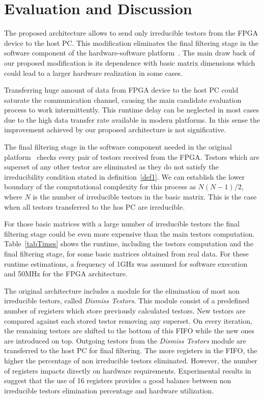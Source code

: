 \documentclass[conference]{IEEEtran}
\begin{document}
\section{Evaluation and Discussion}
\label{sect:6}

The proposed architecture allows to send only irreducible testors from the FPGA device to the 
host PC. This modification eliminates the final filtering stage in the software component of the 
hardware-software platform~\cite{Rojas12}. The main draw back of our proposed modification is its 
dependence with basic matrix dimensions which could lead to a larger hardware realization in some 
cases.  

Transferring huge amount of data from FPGA device to the host PC could saturate the communication 
channel, causing the main candidate evaluation process to work intermittently. This runtime delay 
can be neglected in most cases due to the high data transfer rate available in modern platforms. 
In this sense the improvement achieved by our proposed architecture is not significative.

The final filtering stage in the software component needed in the original platform~\cite{Rojas12} checks 
every pair of testors received from the FPGA. Testors which are superset of any other testor are 
eliminated as they do not satisfy the irreducibility condition stated in definition~\ref{def1}. We 
can establish the lower boundary of the computational complexity for this process as $N(N-1)/2$, 
where $N$ is the number of irreducible testors in the basic matrix. This is the case when all testors 
transferred to the hos PC are irreducible.

For those basic matrices with a large number of irreducible testors the final filtering stage could be 
even more expensive than the main testors computation. Table~\ref{tabTimes} shows the runtime, including 
the testors computation and the final filtering stage, for some basic matrices obtained from real data. 
For these runtime estimations, a frequency of 1GHz was assumed for software execution and 50MHz for the 
FPGA architecture.

The original architecture includes a module for the elimination of most non irreducible testors, called 
\textit{Dismiss Testors}. This module consist of a predefined number of registers which store previously 
calculated testors. New testors are compared against each stored testor removing any superset. On every 
iteration, the remaining testors are shifted to the bottom of this FIFO while the new ones are introduced 
on top. Outgoing testors from the \textit{Dismiss Testors} module are transferred to the host PC for final 
filtering. The more registers in the FIFO, the higher the percentage of non irreducible testors eliminated.
However, the number of registers impacts directly on hardware requirements. Experimental results 
in~\cite{Rojas12} suggest that the use of 16 registers provides a good balance between  non irreducible testors
elimination percentage and hardware utilization. 
\end{document}

